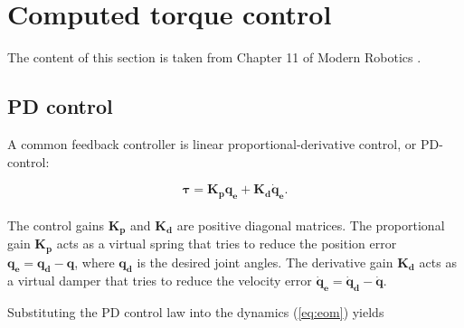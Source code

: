 



\section{Computed torque control}
The content of this section is taken from Chapter 11 of Modern Robotics \cite{lynch2017modernCompTorque}.

\subsection{PD control}
A common feedback controller is linear proportional-derivative control, or PD-control:

\begin{equation}\label{eq:pd}
    \boldsymbol{\tau} = \mathbf{K_p q_e + K_d \dot{q}_e}.
\end{equation}
\\
The control gains $\mathbf{K_p}$ and $\mathbf{K_d}$ are positive diagonal matrices. The proportional gain $\mathbf{K_p}$ acts as a virtual spring that tries to reduce the position error $\mathbf{q_e = q_d - q}$, where $\mathbf{q_d}$ is the desired joint angles. The derivative gain $\mathbf{K_d}$ acts as a virtual damper that tries to reduce the velocity error $\mathbf{\dot{q}_e = \dot{q}_d - \dot{q}}$.

Substituting the PD control law into the dynamics (\ref{eq:eom}) yields

